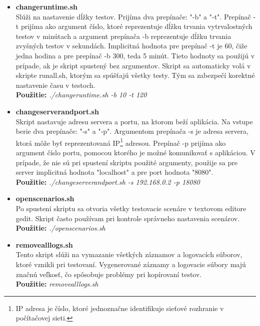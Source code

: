 \documentclass[12pt,oneside,final]{fithesis-utf8}
\newcommand\underscore[1]{\underline{\hspace{8pt}}}
\begin{document}
\begin{itemize}
\item \textbf{change\underscore{}runtime.sh}\\
Slúži na nastavenie dĺžky testov. Prijíma dva prepínače: "{}-b"{} a "{}-t"{}. Prepínač -t prijíma ako argument číslo, ktoré reprezentuje dĺžku trvania vytrvalostných testov v minútach a argument prepínača -b reprezentuje dĺžku trvania zvyšných testov v sekundách. Implicitná hodnota pre prepínač -t je 60, čiže jedna hodina a pre prepínač -b 300, teda 5 minút. Tieto hodnoty sa použijú v prípade, ak je skript spustený bez argumentov. Skript sa automaticky volá v skripte run\underscore{}all.sh, ktorým sa spúšťajú všetky testy. Tým sa zabezpečí korektné nastavenie času v testoch.\\
\textbf{Použitie:} \textit{./change\underscore{}runtime.sh -b 10 -t 120}

\item \textbf{change\underscore{}server\underscore{}and\underscore{}port.sh}\\
Skript nastavuje adresu servera a portu, na ktorom beží aplikácia. Na vstupe berie dva prepínače: "{}-s"{} a "{}-p"{}. Argumentom prepínača -s je adresa servera, ktorá môže byť reprezentovaná IP\footnote{IP adresa je číslo, ktoré jednoznačne identifikuje sieťové rozhranie v počítačovej sieti.} adresou. Prepínač -p prijíma ako argument číslo portu, pomocou ktorého je možné komunikovať s aplikáciou. V prípade, že nie sú pri spustení skriptu použité argumenty, použije sa pre server implicitná hodnota "{}localhost"{} a pre port hodnota "{}8080"{}.\\
\textbf{Použitie:} \textit{./change\underscore{}server\underscore{}and\underscore{}port.sh -s 192.168.0.2 -p 18080}

\item \textbf{open\underscore{}scenarios.sh}\\
Po spustení skriptu sa otvoria všetky testovacie scenáre v textovom editore gedit. Skript často používam pri kontrole správneho nastavenia scenárov.\\
\textbf{Použitie:} \textit{./open\underscore{}scenarios.sh}

\newpage
\item \textbf{remove\underscore{}all\underscore{}logs.sh}\\
Tento skript slúži na vymazanie všetkých záznamov a logovacích súborov, ktoré vznikli pri testovaní. Vygenerované záznamy a logovacie súbory majú značnú veľkosť, čo spôsobuje problémy pri kopírovaní testov.\\
\textbf{Použitie:} \textit{remove\underscore{}all\underscore{}logs.sh}


\end{itemize}
\end{document}
